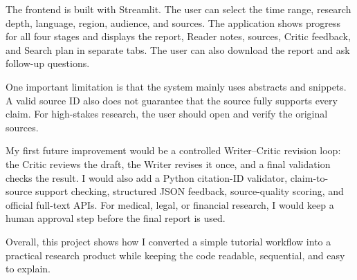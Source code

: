 \documentclass[11pt,a4paper]{article}
\begin{document}
\begin{tcolorbox}[colback=Soft,colframe=Brand,boxrule=.7pt,arc=2mm,left=3mm,right=3mm,top=2mm,bottom=2mm]
The frontend is built with Streamlit. The user can select the time range, research depth, language, region, audience, and sources. The application shows progress for all four stages and displays the report, Reader notes, sources, Critic feedback, and Search plan in separate tabs. The user can also download the report and ask follow-up questions.

One important limitation is that the system mainly uses abstracts and snippets. A valid source ID also does not guarantee that the source fully supports every claim. For high-stakes research, the user should open and verify the original sources.

My first future improvement would be a controlled Writer--Critic revision loop: the Critic reviews the draft, the Writer revises it once, and a final validation checks the result. I would also add a Python citation-ID validator, claim-to-source support checking, structured JSON feedback, source-quality scoring, and official full-text APIs. For medical, legal, or financial research, I would keep a human approval step before the final report is used.

Overall, this project shows how I converted a simple tutorial workflow into a practical research product while keeping the code readable, sequential, and easy to explain.
\end{tcolorbox}
\end{document}
